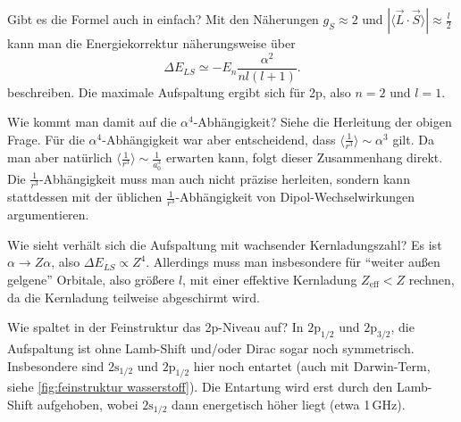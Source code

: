 \begin{fquestion}{Gibt es die Formel auch in einfach?}
    Mit den Näherungen $g_S\approx 2$ und $|\langle \Vec{L}\cdot\Vec{S} \rangle| \approx \frac{l}{2}$ kann man die Energiekorrektur näherungsweise über
    $$\Delta E_{LS} \simeq -E_n\frac{\alpha^2}{nl(l+1)}. $$
    beschreiben.
    Die maximale Aufspaltung ergibt sich für 2p, also $n=2$ und $l=1$.
\end{fquestion}

\begin{fquestion}{Wie kommt man damit auf die $\alpha^4$-Abhängigkeit?}
    Siehe die Herleitung der obigen Frage. 
    Für die $\alpha^4$-Abhängigkeit war aber entscheidend, dass $\langle \frac{1}{r^3} \rangle \sim \alpha^3$ gilt.
    Da man aber natürlich $\langle \frac{1}{r^3} \rangle \sim \frac{1}{a_0^3}$ erwarten kann, folgt dieser Zusammenhang direkt.
    Die $\frac{1}{r^3}$-Abhängigkeit muss man auch nicht präzise herleiten, sondern kann stattdessen mit der üblichen $\frac{1}{r^3}$-Abhängigkeit von Dipol-Wechselwirkungen argumentieren.
\end{fquestion}

\begin{fquestion}{Wie sieht verhält sich die Aufspaltung mit wachsender Kernladungszahl?}
    Es ist $\alpha \rightarrow Z\alpha$, also $\Delta E_{LS} \propto Z^4$.
    Allerdings muss man insbesondere für ``weiter außen gelgene'' Orbitale, also größere $l$, mit einer effektive Kernladung $Z_\mathrm{eff} < Z$ rechnen, da die Kernladung teilweise abgeschirmt wird.
\end{fquestion}


\begin{fquestion}{Wie spaltet in der Feinstruktur das 2p-Niveau auf?}
    In $2\mathrm{p}_{1/2}$ und $2\mathrm{p}_{3/2}$, die Aufspaltung ist ohne Lamb-Shift und/oder Dirac sogar noch symmetrisch.  
    Insbesondere sind $2\mathrm{s}_{1/2}$ und $2\mathrm{p}_{1/2}$ hier noch entartet (auch mit Darwin-Term, siehe \autoref{fig:feinstruktur wasserstoff}).
    Die Entartung wird erst durch den Lamb-Shift aufgehoben, wobei $2\mathrm{s}_{1/2}$ dann energetisch höher liegt (etwa 1\,GHz). 
\end{fquestion}

